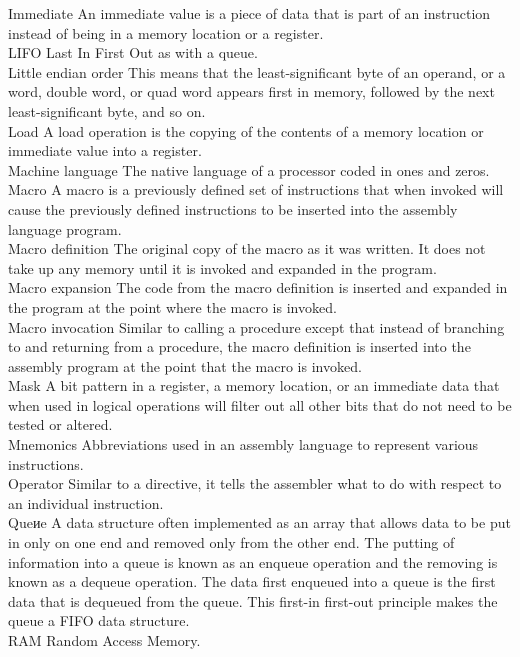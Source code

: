 \documentclass[10pt]{book}
\begin{document}
Immediate An immediate value is a piece of data that is part of an instruction instead of being in a memory location or a register.\\
LIFO Last In First Out as with a queue.\\
Little endian order This means that the least-significant byte of an operand, or a word, double word, or quad word appears first in memory, followed by the next least-significant byte, and so on.\\
Load A load operation is the copying of the contents of a memory location or immediate value into a register.\\
Machine language The native language of a processor coded in ones and zeros.\\
Macro A macro is a previously defined set of instructions that when invoked will cause the previously defined instructions to be inserted into the assembly language program.\\
Macro definition The original copy of the macro as it was written. It does not take up any memory until it is invoked and expanded in the program.\\
Macro expansion The code from the macro definition is inserted and expanded in the program at the point where the macro is invoked.\\
Macro invocation Similar to calling a procedure except that instead of branching to and returning from a procedure, the macro definition is inserted into the assembly program at the point that the macro is invoked.\\
Mask A bit pattern in a register, a memory location, or an immediate data that when used in logical operations will filter out all other bits that do not need to be tested or altered.\\
Mnemonics Abbreviations used in an assembly language to represent various instructions.\\
Operator Similar to a directive, it tells the assembler what to do with respect to an individual instruction.\\
Queиe A data structure often implemented as an array that allows data to be put in only on one end and removed only from the other end. The putting of information into a queue is known as an enqueue operation and the removing is known as a dequeue operation. The data first enqueued into a queue is the first data that is dequeued from the queue. This first-in first-out principle makes the queue a FIFO data structure.\\
RAM Random Access Memory.\\
\end{document}

